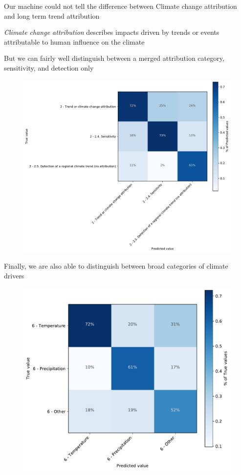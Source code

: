 \documentclass[9pt]{beamer}
\begin{document}
\begin{frame}{Our machine could not tell the difference between Climate change attribution and long term trend attribution}

\textit{Climate change attribution} describes impacts driven by trends or events attributable to human influence on the climate

\medskip

But we can fairly well distinguish between a merged attribution category, sensitivity, and detection only

\begin{figure}
	\includegraphics[width=0.6\linewidth]{../plots/prediction_models/attribution_category_confusion_precision.pdf}
\end{figure}
\end{frame}

\begin{frame}{Finally, we are also able to distinguish between broad categories of climate drivers}

\begin{figure}
	\includegraphics[width=0.6\linewidth]{../plots/prediction_models/driver_category_confusion_recall.pdf}
\end{figure}
\end{frame}
\end{document}
